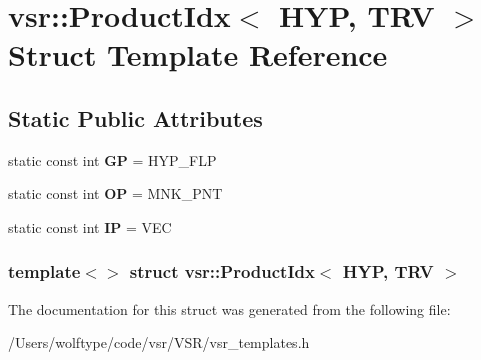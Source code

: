 \hypertarget{structvsr_1_1_product_idx_3_01_h_y_p_00_01_t_r_v_01_4}{\section{vsr\-:\-:Product\-Idx$<$ H\-Y\-P, T\-R\-V $>$ Struct Template Reference}
\label{structvsr_1_1_product_idx_3_01_h_y_p_00_01_t_r_v_01_4}
}
\subsection*{Static Public Attributes}
\begin{DoxyCompactItemize}
\item 
\hypertarget{structvsr_1_1_product_idx_3_01_h_y_p_00_01_t_r_v_01_4_ae9ac3e4569fb32ccd4e14c23507f55b4}{static const int {\bfseries G\-P} = H\-Y\-P\-\_\-\-F\-L\-P}\label{structvsr_1_1_product_idx_3_01_h_y_p_00_01_t_r_v_01_4_ae9ac3e4569fb32ccd4e14c23507f55b4}

\item 
\hypertarget{structvsr_1_1_product_idx_3_01_h_y_p_00_01_t_r_v_01_4_ae2a86d4a97012a77e24d27c77e9abec9}{static const int {\bfseries O\-P} = M\-N\-K\-\_\-\-P\-N\-T}\label{structvsr_1_1_product_idx_3_01_h_y_p_00_01_t_r_v_01_4_ae2a86d4a97012a77e24d27c77e9abec9}

\item 
\hypertarget{structvsr_1_1_product_idx_3_01_h_y_p_00_01_t_r_v_01_4_a5a15c402a42ea0931b990898227c5af4}{static const int {\bfseries I\-P} = V\-E\-C}\label{structvsr_1_1_product_idx_3_01_h_y_p_00_01_t_r_v_01_4_a5a15c402a42ea0931b990898227c5af4}

\end{DoxyCompactItemize}
\subsubsection*{template$<$$>$ struct vsr\-::\-Product\-Idx$<$ H\-Y\-P, T\-R\-V $>$}



The documentation for this struct was generated from the following file\-:\begin{DoxyCompactItemize}
\item 
/\-Users/wolftype/code/vsr/\-V\-S\-R/vsr\-\_\-templates.\-h\end{DoxyCompactItemize}
